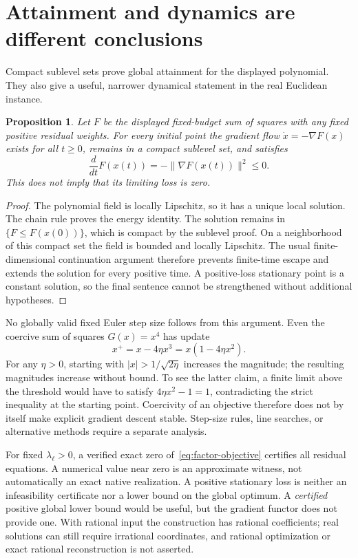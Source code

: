 \documentclass[11pt]{article}
\newtheorem{proposition}[theorem]{Proposition}
\theoremstyle{remark}
\begin{document}
\section{Attainment and dynamics are different conclusions}\label{sec:dynamics}

Compact sublevel sets prove global attainment for the displayed polynomial. They also give a useful, narrower dynamical statement in the real Euclidean instance.

\begin{proposition}\label{prop:flow-complete}
Let $F$ be the displayed fixed-budget sum of squares with any fixed positive residual weights. For every initial point the gradient flow $\dot x=-\nabla F(x)$ exists for all $t\ge0$, remains in a compact sublevel set, and satisfies
\[
 \frac{d}{dt}F(x(t))=-\|\nabla F(x(t))\|^2\le0.
\]
This does not imply that its limiting loss is zero.
\end{proposition}
\begin{proof}
The polynomial field is locally Lipschitz, so it has a unique local solution. The chain rule proves the energy identity. The solution remains in $\{F\le F(x(0))\}$, which is compact by the sublevel proof. On a neighborhood of this compact set the field is bounded and locally Lipschitz. The usual finite-dimensional continuation argument therefore prevents finite-time escape and extends the solution for every positive time. A positive-loss stationary point is a constant solution, so the final sentence cannot be strengthened without additional hypotheses.
\end{proof}

No globally valid fixed Euler step size follows from this argument. Even the coercive sum of squares $G(x)=x^4$ has update
\[
 x^+=x-4\eta x^3=x(1-4\eta x^2).
\]
For any $\eta>0$, starting with $|x|>1/\sqrt{2\eta}$ increases the magnitude; the resulting magnitudes increase without bound. To see the latter claim, a finite limit above the threshold would have to satisfy $4\eta x^2-1=1$, contradicting the strict inequality at the starting point. Coercivity of an objective therefore does not by itself make explicit gradient descent stable. Step-size rules, line searches, or alternative methods require a separate analysis.

For fixed $\lambda_\ell>0$, a verified exact zero of~\eqref{eq:factor-objective} certifies all residual equations. A numerical value near zero is an approximate witness, not automatically an exact native realization. A positive stationary loss is neither an infeasibility certificate nor a lower bound on the global optimum. A \emph{certified} positive global lower bound would be useful, but the gradient functor does not provide one. With rational input the construction has rational coefficients; real solutions can still require irrational coordinates, and rational optimization or exact rational reconstruction is not asserted.
\end{document}
